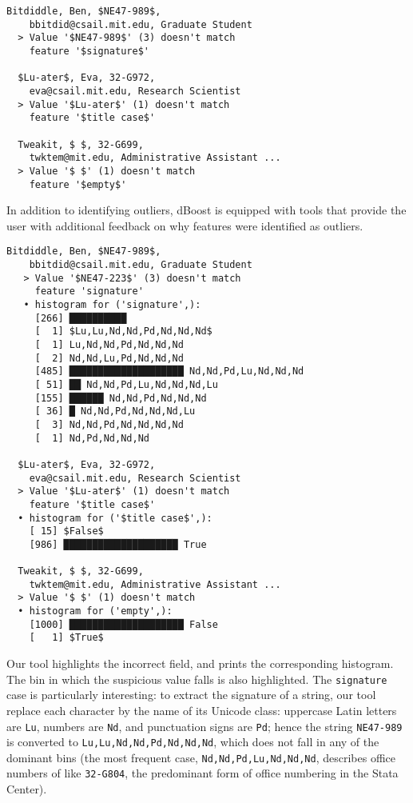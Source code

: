 \begin{lstlisting}[gobble=2]
  Bitdiddle, Ben, $NE47-989$,
    bbitdid@csail.mit.edu, Graduate Student
  > Value '$NE47-989$' (3) doesn't match
    feature '$signature$'

  $Lu-ater$, Eva, 32-G972,
    eva@csail.mit.edu, Research Scientist
  > Value '$Lu-ater$' (1) doesn't match
    feature '$title case$'

  Tweakit, $ $, 32-G699,
    twktem@mit.edu, Administrative Assistant ...
  > Value '$ $' (1) doesn't match
    feature '$empty$'
\end{lstlisting}

In addition to identifying outliers, dBoost is equipped with tools that provide the user with additional feedback on why features were identified as outliers.

\begin{lstlisting}[gobble=2]
  Bitdiddle, Ben, $NE47-989$,
    bbitdid@csail.mit.edu, Graduate Student
   > Value '$NE47-223$' (3) doesn't match
     feature 'signature'
   • histogram for ('signature',):
     [266] ██████████
     [  1] $Lu,Lu,Nd,Nd,Pd,Nd,Nd,Nd$
     [  1] Lu,Nd,Nd,Pd,Nd,Nd,Nd
     [  2] Nd,Nd,Lu,Pd,Nd,Nd,Nd
     [485] ████████████████████ Nd,Nd,Pd,Lu,Nd,Nd,Nd
     [ 51] ██ Nd,Nd,Pd,Lu,Nd,Nd,Nd,Lu
     [155] ██████ Nd,Nd,Pd,Nd,Nd,Nd
     [ 36] █ Nd,Nd,Pd,Nd,Nd,Nd,Lu
     [  3] Nd,Nd,Pd,Nd,Nd,Nd,Nd
     [  1] Nd,Pd,Nd,Nd,Nd

  $Lu-ater$, Eva, 32-G972,
    eva@csail.mit.edu, Research Scientist
  > Value '$Lu-ater$' (1) doesn't match
    feature '$title case$'
  • histogram for ('$title case$',):
    [ 15] $False$
    [986] ████████████████████ True

  Tweakit, $ $, 32-G699,
    twktem@mit.edu, Administrative Assistant ...
  > Value '$ $' (1) doesn't match
  • histogram for ('empty',):
    [1000] ████████████████████ False
    [   1] $True$
\end{lstlisting}

Our tool highlights the incorrect field, and prints the corresponding histogram. The bin in which the suspicious value falls is also highlighted. The \lstinline{signature} case is particularly interesting: to extract the signature of a string, our tool replace each character by the name of its Unicode class: uppercase Latin letters are \lstinline{Lu}, numbers are \lstinline{Nd}, and punctuation signs are \lstinline{Pd}; hence the string \lstinline{NE47-989} is converted to \lstinline{Lu,Lu,Nd,Nd,Pd,Nd,Nd,Nd}, which does not fall in any of the dominant bins (the most frequent case, \lstinline{Nd,Nd,Pd,Lu,Nd,Nd,Nd}, describes office numbers of like \lstinline{32-G804}, the predominant form of office numbering in the Stata Center).

